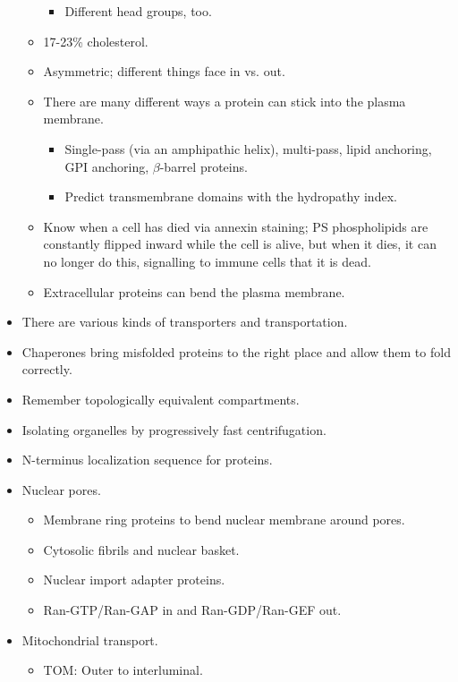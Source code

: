 \documentclass[../notes.tex]{subfiles}
\begin{document}
\begin{itemize}
\begin{itemize}
\begin{itemize}
            \item Different head groups, too.
        \end{itemize}
        \item 17-23\% cholesterol.
        \item Asymmetric; different things face in vs. out.
        \item There are many different ways a protein can stick into the plasma membrane.
        \begin{itemize}
            \item Single-pass (via an amphipathic helix), multi-pass, lipid anchoring, GPI anchoring, $\beta$-barrel proteins.
            \item Predict transmembrane domains with the hydropathy index.
        \end{itemize}
        \item Know when a cell has died via annexin staining; PS phospholipids are constantly flipped inward while the cell is alive, but when it dies, it can no longer do this, signalling to immune cells that it is dead.
        \item Extracellular proteins can bend the plasma membrane.
    \end{itemize}
    \item There are various kinds of transporters and transportation.
    \item Chaperones bring misfolded proteins to the right place and allow them to fold correctly.
    \item Remember topologically equivalent compartments.
    \item Isolating organelles by progressively fast centrifugation.
    \item N-terminus localization sequence for proteins.
    \item Nuclear pores.
    \begin{itemize}
        \item Membrane ring proteins to bend nuclear membrane around pores.
        \item Cytosolic fibrils and nuclear basket.
        \item Nuclear import adapter proteins.
        \item Ran-GTP/Ran-GAP in and Ran-GDP/Ran-GEF out.
    \end{itemize}
    \item Mitochondrial transport.
    \begin{itemize}
        \item TOM: Outer to interluminal.

\end{itemize}
\end{itemize}
\end{document}

